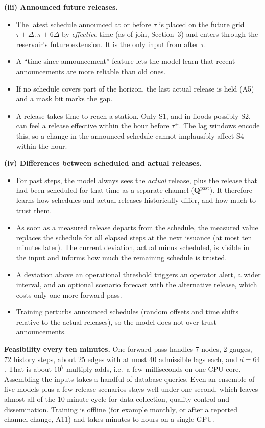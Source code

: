 \textbf{(iii) Announced future releases.}
\begin{itemize}[leftmargin=*,itemsep=1pt]
\item The latest schedule announced at or before $\tau$ is placed on the future grid
$\tau+\Delta..\tau+6\Delta$ by \emph{effective} time (as-of join, Section~3) and enters through the
reservoir's future extension. It is the only input from after $\tau$.
\item A ``time since announcement'' feature lets the model learn that recent announcements are
more reliable than old ones.
\item If no schedule covers part of the horizon, the last actual release is held (A5) and a mask
bit marks the gap.
\item A release takes time to reach a station. Only S1, and in floods possibly S2, can feel a release
effective within the hour before $\tau^{+}$. The lag windows encode this, so a change in the
announced schedule cannot implausibly affect S4 within the hour.
\end{itemize}

\textbf{(iv) Differences between scheduled and actual releases.}
\begin{itemize}[leftmargin=*,itemsep=1pt]
\item For past steps, the model always sees the \emph{actual} release, plus the release that had
been scheduled for that time as a separate channel ($\mathbf{Q}^{\mathrm{past}}$). It therefore
learns how schedules and actual releases historically differ, and how much to trust them.
\item As soon as a measured release departs from the schedule, the measured value replaces the
schedule for all elapsed steps at the next issuance (at most ten minutes later). The current
deviation, actual minus scheduled, is visible in the input and informs how much the remaining
schedule is trusted.
\item A deviation above an operational threshold triggers an operator alert, a wider interval, and
an optional scenario forecast with the alternative release, which costs only one more forward pass.
\item Training perturbs announced schedules (random offsets and time shifts relative to the actual
releases), so the model does not over-trust announcements.
\end{itemize}

\textbf{Feasibility every ten minutes.} One forward pass handles 7 nodes, 2 gauges, 72 history
steps, about 25 edges with at most 40 admissible lags each, and $d=64$. That is about $10^{7}$
multiply-adds, i.e.\ a few milliseconds on one CPU core. Assembling the inputs takes a handful of
database queries. Even an ensemble of five models plus a few release scenarios stays well under one
second, which leaves almost all of the 10-minute cycle for data collection, quality control and
dissemination. Training is offline (for example monthly, or after a reported channel change, A11)
and takes minutes to hours on a single GPU.
